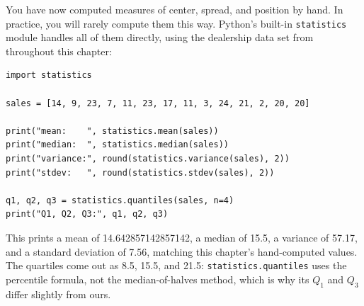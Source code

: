 You have now computed measures of center, spread, and position by
hand. In practice, you will
rarely compute them this way. Python's built-in \texttt{statistics}
module handles all of them directly, using the dealership data set
from throughout this chapter:

\begin{verbatim}
import statistics

sales = [14, 9, 23, 7, 11, 23, 17, 11, 3, 24, 21, 2, 20, 20]

print("mean:    ", statistics.mean(sales))
print("median:  ", statistics.median(sales))
print("variance:", round(statistics.variance(sales), 2))
print("stdev:   ", round(statistics.stdev(sales), 2))

q1, q2, q3 = statistics.quantiles(sales, n=4)
print("Q1, Q2, Q3:", q1, q2, q3)
\end{verbatim}

This prints a mean of 14.642857142857142, a median of 15.5, a
variance of 57.17, and a standard deviation of 7.56, matching this
chapter's hand-computed values. The quartiles come out as 8.5, 15.5, and
21.5: \texttt{statistics.quantiles} uses the percentile formula, not the
median-of-halves method, which is why its $Q_1$ and $Q_3$ differ slightly
from ours.




